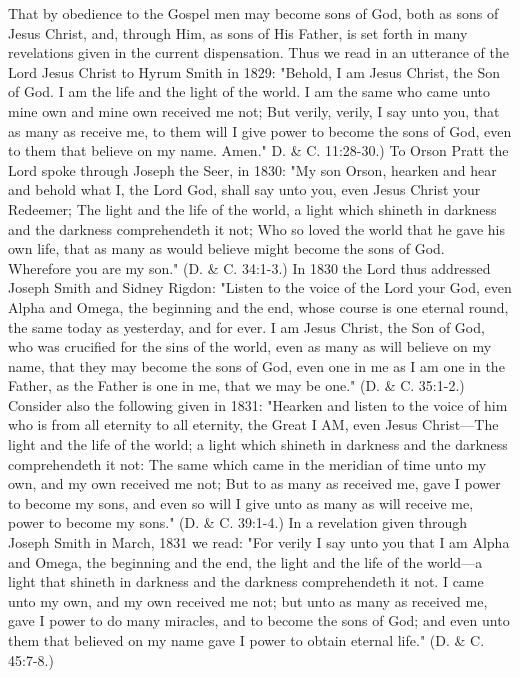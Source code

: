 That by obedience to the Gospel men may become sons of God, both as sons of Jesus Christ,
and, through Him, as sons of His Father, is set forth in many revelations given in the current
dispensation. Thus we read in an utterance of the Lord Jesus Christ to Hyrum Smith in 1829:
"Behold, I am Jesus Christ, the Son of God. I am the life and the light of the world. I am the
same who came unto mine own and mine own received me not; But verily, verily, I say unto
you, that as many as receive me, to them will I give power to become the sons of God, even
to them that believe on my name. Amen." D. \& C. 11:28-30.) To Orson Pratt the Lord spoke
through Joseph the Seer, in 1830: "My son Orson, hearken and hear and behold what I, the
Lord God, shall say unto you, even Jesus Christ your Redeemer; The light and the life of the
world, a light which shineth in darkness and the darkness comprehendeth it not; Who so
loved the world that he gave his own life, that as many as would believe might become the
sons of God. Wherefore you are my son." (D. \& C. 34:1-3.) In 1830 the Lord thus addressed
Joseph Smith and Sidney Rigdon: "Listen to the voice of the Lord your God, even Alpha and
Omega, the beginning and the end, whose course is one eternal round, the same today as
yesterday, and for ever. I am Jesus Christ, the Son of God, who was crucified for the sins of
the world, even as many as will believe on my name, that they may become the sons of God,
even one in me as I am one in the Father, as the Father is one in me, that we may be one." (D.
\& C. 35:1-2.) Consider also the following given in 1831: "Hearken and listen to the voice of
him who is from all eternity to all eternity, the Great I AM, even Jesus Christ—The light and
the life of the world; a light which shineth in darkness and the darkness comprehendeth it
not: The same which came in the meridian of time unto my own, and my own received me
not; But to as many as received me, gave I power to become my sons, and even so will I give
unto as many as will receive me, power to become my sons." (D. \& C. 39:1-4.) In a
revelation given through Joseph Smith in March, 1831 we read: "For verily I say unto you
that I am Alpha and Omega, the beginning and the end, the light and the life of the world—a
light that shineth in darkness and the darkness comprehendeth it not. I came unto my own,
and my own received me not; but unto as many as received me, gave I power to do many
miracles, and to become the sons of God; and even unto them that believed on my name gave
I power to obtain eternal life." (D. \& C. 45:7-8.)

